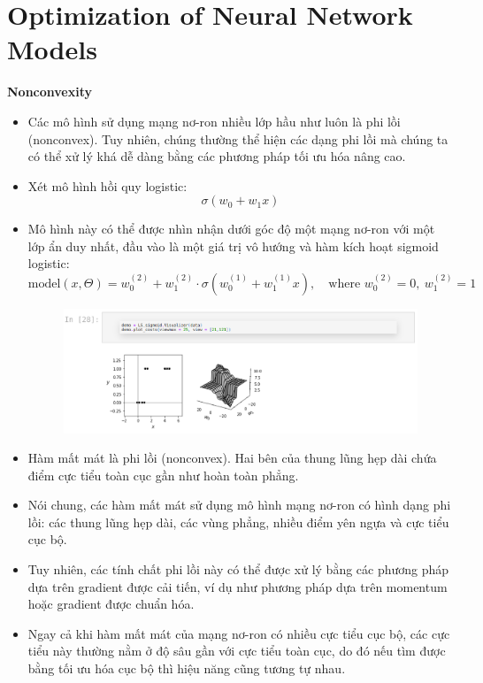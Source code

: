 \documentclass{book}
\begin{document}
\section{Optimization of Neural Network Models}
\textbf{Nonconvexity}
\begin{itemize}
    \item Các mô hình sử dụng mạng nơ-ron nhiều lớp hầu như luôn là phi lồi (nonconvex). Tuy nhiên, chúng thường thể hiện các dạng phi lồi mà chúng ta có thể xử lý khá dễ dàng bằng các phương pháp tối ưu hóa nâng cao.
    \item Xét mô hình hồi quy logistic:
    \[
    \sigma(w_0 + w_1 x)
    \]
    \item Mô hình này có thể được nhìn nhận dưới góc độ một mạng nơ-ron với một lớp ẩn duy nhất, đầu vào là một giá trị vô hướng và hàm kích hoạt sigmoid logistic:
    \[
    \text{model}(x, \Theta) = w^{(2)}_0 + w^{(2)}_1 \cdot \sigma(w^{(1)}_0 + w^{(1)}_1 x), \quad \text{where } w^{(2)}_0 = 0,\ w^{(2)}_1 = 1
    \]
    \begin{figure}[H]
        \centering
        \includegraphics[width=1.0\linewidth]{images/non1.png}
        \label{fig:non1}
    \end{figure}
    \item Hàm mất mát là phi lồi (nonconvex). Hai bên của thung lũng hẹp dài chứa điểm cực tiểu toàn cục gần như hoàn toàn phẳng.
    \item Nói chung, các hàm mất mát sử dụng mô hình mạng nơ-ron có hình dạng phi lồi: các thung lũng hẹp dài, các vùng phẳng, nhiều điểm yên ngựa và cực tiểu cục bộ.
    \item Tuy nhiên, các tính chất phi lồi này có thể được xử lý bằng các phương pháp dựa trên gradient được cải tiến, ví dụ như phương pháp dựa trên momentum hoặc gradient được chuẩn hóa.
    \item Ngay cả khi hàm mất mát của mạng nơ-ron có nhiều cực tiểu cục bộ, các cực tiểu này thường nằm ở độ sâu gần với cực tiểu toàn cục, do đó nếu tìm được bằng tối ưu hóa cục bộ thì hiệu năng cũng tương tự nhau.

\end{itemize}
\end{document}
